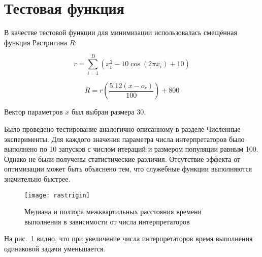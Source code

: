 \section*{Тестовая функция}

В качестве тестовой функции для минимизации
использовалась смещённая функция Растригина $R$:

\begin{equation*}
    r = \sum_{i = 1}^{D}(x_i^2 - 10\cos(2 \pi x_i) + 10)
\end{equation*}

\begin{equation*}
    R = r\left(\frac{5.12 (x - o_r)}{100}\right) + 800
\end{equation*}

Вектор параметров $x$ был выбран размера 30.

Было проведено тестирование
аналогично описанному в разделе
Численные эксперименты.
Для каждого значения параметра
числа интерпретаторов было выполнено
по 10 запусков
с числом итераций и размером популяции
равным 100.
Однако не были получены
статистические различия.
Отсутствие эффекта
от оптимизации может
быть объяснено тем,
что служебные функции
выполняются значительно быстрее.

\begin{figure}[h]
\texttt{[image: rastrigin]}
\caption{Медиана и полтора межквартильных расстояния
времени выполнения в зависимости от числа интерпретаторов}
\label{fig:rastriginboxplot}
\end{figure}

На рис.~\ref{fig:rastriginboxplot} видно,
что при увеличение числа интерпретаторов
время выполнения одинаковой задачи уменьшается.

